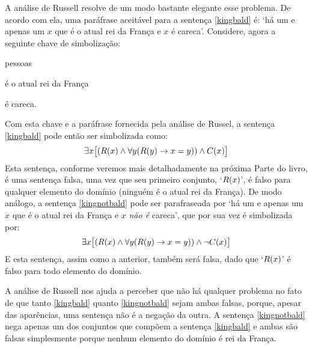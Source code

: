 A análise de Russell resolve de um modo bastante elegante esse problema.
De acordo com ela, uma paráfrase aceitável para a sentença \ref{kingbald} é: `há um e apenas um $x$ que é o atual rei da França e $x$ é careca'.
Considere, agora a seguinte chave de simbolização:
	\begin{center}
	\begin{ekey}
		\item[\text{domínio}] pessoas
		\item[\atom{R}{x}]  é o atual rei da França
		\item[\atom{C}{x}]  é careca.
	\end{ekey}
	\end{center}
Com esta chave e a paráfrase fornecida pela análise de Russel, a sentença \ref{kingbald} pode então ser simbolizada como:
$$\exists x \bigl[(\mathord{R}(x) \wedge \forall y (\mathord{R}(y) \rightarrow x = y)) \wedge \mathord{C}(x)\bigr]$$
Esta sentença, conforme veremos mais detalhadamente na próxima Parte do livro, é uma sentença falsa, uma vez que seu primeiro conjunto, `$\mathord{R}(x)$', é falso para qualquer elemento do domínio (ninguém é o atual rei da França).
De modo análogo, a sentença \ref{kingnotbald} pode ser parafraseada por `há um e apenas um $x$ que é o atual rei da França e $x$ \emph{não é} careca', que por sua vez é simbolizada por:
$$\exists x \bigl[(\mathord{R}(x) \wedge \forall y (\mathord{R}(y) \rightarrow x = y)) \wedge \neg\mathord{C}(x)\bigr]$$
E esta sentença, assim como a anterior, também será falsa, dado que `$\mathord{R}(x)$' é falso para todo elemento do domínio.

A análise de Russell nos ajuda a perceber que não há qualquer problema no fato de que tanto \ref{kingbald} quanto \ref{kingnotbald} sejam ambas falsas, porque, apesar das aparências, uma sentença não é a negação da outra.
A sentença  \ref{kingnotbald} nega apenas um dos conjuntos que compõem a sentença \ref{kingbald} e ambas são falsas simplesmente porque nenhum elemento do domínio é rei da França.

